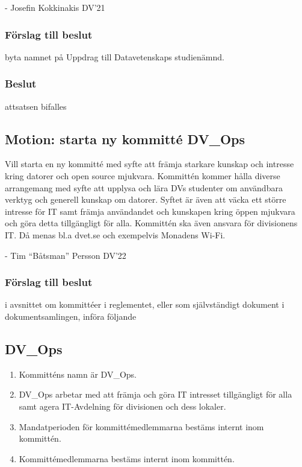 \documentclass[protokoll]{dvd}
\begin{document}
- Josefin Kokkinakis DV'21
\subsubsection*{Förslag till beslut}
\begin{attsatser}
	\item byta namnet på Uppdrag till Datavetenskaps studienämnd.
\end{attsatser}
\subsubsection*{Beslut}
\begin{attsatser}
    \item attsatsen bifalles
\end{attsatser}

\subsection{Motion: starta ny kommitté DV\_Ops}
Vill starta en ny kommitté med syfte att främja starkare kunskap och intresse kring
datorer och open source mjukvara. Kommittén kommer hålla diverse arrangemang med
syfte att upplysa och lära DVs studenter om användbara verktyg och generell kunskap
om datorer. Syftet är även att väcka ett större intresse för IT samt främja användandet
och kunskapen kring öppen mjukvara och göra detta tillgängligt för alla.
Kommittén ska även ansvara för divisionens IT. Då menas bl.a dvet.se och exempelvis Monadens Wi-Fi.

- Tim “Båtsman” Persson DV'22
\subsubsection*{Förslag till beslut}
\begin{attsatser}
    \item i avsnittet om kommittéer i reglementet, eller som självständigt dokument i dokumentsamlingen, införa följande

    \begin{displayquote}
        \subsection*{DV\_Ops}
        \begin{enumerate}[label=\arabic* §]
            \item Kommitténs namn är DV\_Ops.

            \item DV\_Ops arbetar med att främja och göra IT intresset tillgängligt för alla samt agera IT-Avdelning för divisionen och dess lokaler.

            \item Mandatperioden för kommittémedlemmarna bestäms internt inom kommittén.

            \item Kommittémedlemmarna bestäms internt inom kommittén.
        \end{enumerate}
    \end{displayquote}
\end{attsatser}
\end{document}
